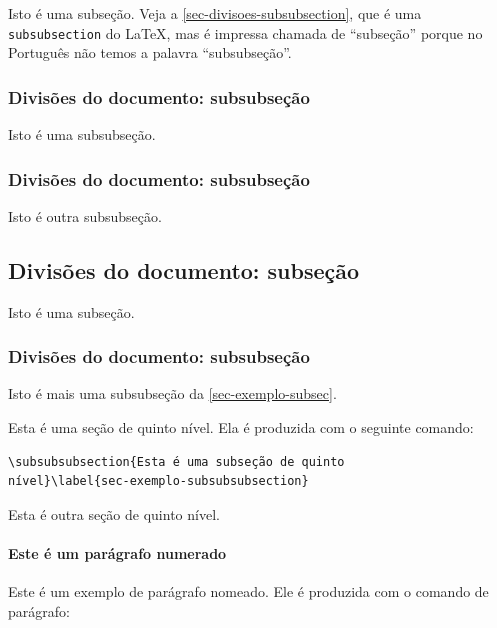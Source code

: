 \documentclass[
	12pt,				%
	openright,			%
	oneside,			    %
	a4paper,				%
	english,			%
	french,			%
	spanish,			%
	brazil			%
	]{abntex2}
\begin{document}
Isto é uma subseção. Veja a \autoref{sec-divisoes-subsubsection}, que é uma
\texttt{subsubsection} do \LaTeX, mas é impressa chamada de ``subseção'' porque
no Português não temos a palavra ``subsubseção''.

\subsubsection{Divisões do documento: subsubseção}
\label{sec-divisoes-subsubsection}

Isto é uma subsubseção.

\subsubsection{Divisões do documento: subsubseção}

Isto é outra subsubseção.

\subsection{Divisões do documento: subseção}\label{sec-exemplo-subsec}

Isto é uma subseção.

\subsubsection{Divisões do documento: subsubseção}

Isto é mais uma subsubseção da \autoref{sec-exemplo-subsec}.


\label{sec-exemplo-subsubsubsection}

Esta é uma seção de quinto nível. Ela é produzida com o seguinte comando:

\begin{verbatim}
\subsubsubsection{Esta é uma subseção de quinto
nível}\label{sec-exemplo-subsubsubsection}
\end{verbatim}

\label{sec-exemplo-subsubsubsection-outro}

Esta é outra seção de quinto nível.


\paragraph{Este é um parágrafo numerado}\label{sec-exemplo-paragrafo}

Este é um exemplo de parágrafo nomeado. Ele é produzida com o comando de
parágrafo:
\end{document}
